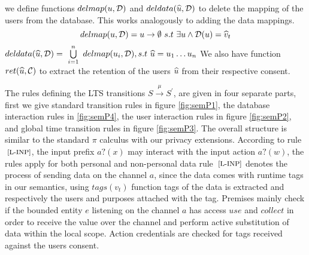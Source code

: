 we define functions $delmap(u, \mathcal{D}) $ and $ deldata(\widehat{u}, \mathcal{D})$ to delete the mapping of the users from the database.  This works analogously to adding the data mappings. 
  \[ delmap(u, \mathcal{D}) =  u \to \emptyset \ s.t \ \exists u \land \mathcal{D}(u) = \widehat{v}_t  \]
    $ deldata(\widehat{u}, \mathcal{D}) =
    \ \bigcup \limits_{i=1}^{n} {\ delmap(u_i, \mathcal{D})}, s.t  \ \widehat{u} = u_1 \dots  u_n \\ $
 We also have function $ret(\widehat{u}, \mathcal{C}) $ to extract the retention of the users $ \widehat{u} $ from their respective consent.
      
The rules defining the LTS transitions $ S \xrightarrow{\mu} S^{'}$, are given in four separate parts, first we give standard transition rules in figure \ref{fig:semP1}, the database interaction rules in \ref{fig:semP4}, the user interaction rules in figure \ref{fig:semP2}, and global time transition rules in figure \ref{fig:semP3}. The overall structure is similar to the standard $ \pi $ calculus with our privacy extensions. According to rule $\scriptsize \text{ [L-INP]}$, the input prefix $ a?(x)$ may interact with the input action $ a?(w)$, the rules apply for both personal and non-personal data rule $\scriptsize \text{ [L-INP]}$ denotes the process of sending data on the channel $ a $, since the data comes with runtime tags in our semantics, using $ tags(v_{t}) $ function tags of the data is extracted and respectively the users and purposes attached with the tag. Premises mainly check if the bounded entity $ e $  listening on the channel  $ a$ has access  $ \textit{use} $ and $ \textit{collect}$ in order to receive the value over the channel and perform active substitution of data within the local scope. Action credentials are checked for tags received against the users consent. %

